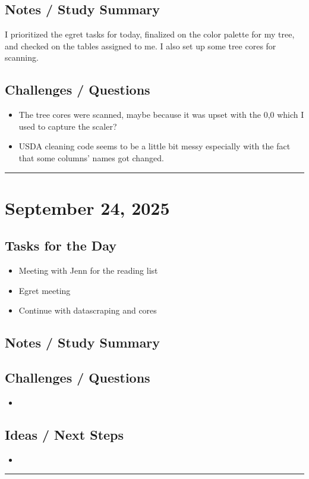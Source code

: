 \documentclass[12pt]{article}
\begin{document}
\subsection*{Notes / Study Summary}
I prioritized the egret tasks for today, finalized on the color palette for my tree, and checked on the tables assigned to me. I also set up some tree cores for scanning.
\subsection*{Challenges / Questions}
\begin{itemize}
    \item The tree cores were scanned, maybe because it was upset with the 0,0 which I used to capture the scaler?
    \item USDA cleaning code seems to be a little bit messy especially with the fact that some columns' names got changed.
\end{itemize}

\vspace{1em}
\hrule
\vspace{1em}
\section*{September 24, 2025}

\subsection*{Tasks for the Day}
\begin{itemize}
    \item Meeting with Jenn for the reading list
    \item Egret meeting
    \item Continue with datascraping and cores
\end{itemize}
\subsection*{Notes / Study Summary}

\subsection*{Challenges / Questions}
\begin{itemize}
    \item 
\end{itemize}

\subsection*{Ideas / Next Steps}
\begin{itemize}
    \item 
\end{itemize}

\vspace{1em}
\hrule
\vspace{1em}
\end{document}
